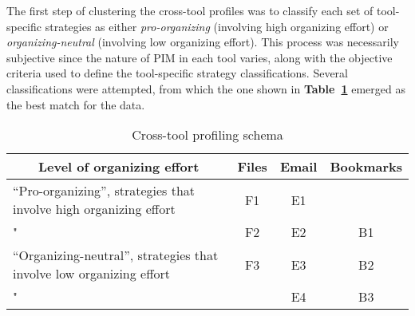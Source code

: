 The first step of clustering the cross-tool profiles was to classify each set of tool-specific strategies as either \textit{pro-organizing} (involving high organizing effort) or \textit{organizing-neutral} (involving low organizing effort). This process was necessarily subjective since the nature of PIM in each tool varies, along with the objective criteria used to define the tool-specific strategy classifications.   Several classifications were attempted, from which the one shown in \textbf{Table~\ref{table:exp-study:strategy-classification}} emerged as the best match for the data. %

\begin{table}[btp]
\begin{center}
\begin{footnotesize}
\setlength{\extrarowheight}{8pt}
\begin{tabular}{|c|c|c|c|}
\hline
{\bf Level of organizing effort} & {\bf Files} & {\bf Email} & {\bf Bookmarks} \\
\hline
\multicolumn{ 1}{|l|}{``Pro-organizing'', strategies that involve high organizing effort} &         F1 &         E1 &            \\
\hline
\multicolumn{ 1}{|l|}{"} &         F2 &         E2 &         B1 \\
\hline
\hline
\multicolumn{ 1}{|l|}{``Organizing-neutral'', strategies that involve low organizing effort} &         F3 &         E3 &         B2 \\
\hline
\multicolumn{ 1}{|l|}{"} &            &         E4 &         B3 \\
\hline
\end{tabular}  
\end{footnotesize}
\caption{Cross-tool profiling schema}
\label{table:exp-study:strategy-classification}
\end{center}
\end{table}
\normalsize

